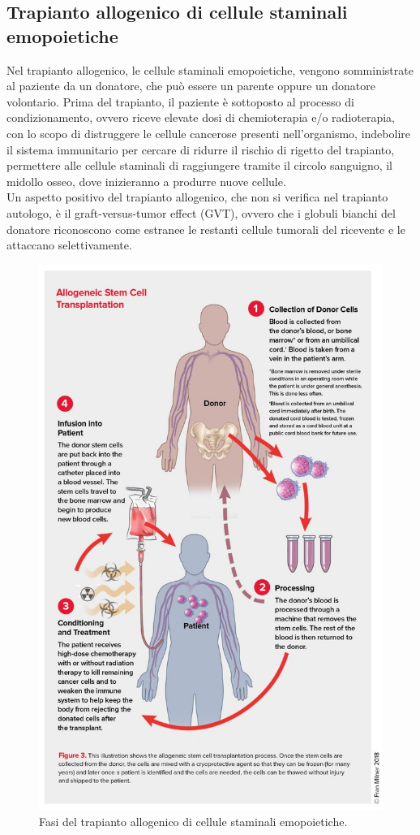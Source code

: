 \subsection{Trapianto allogenico di cellule staminali emopoietiche}

Nel trapianto allogenico, le cellule staminali emopoietiche, vengono somministrate al paziente da un donatore, 
che può essere un parente oppure un donatore volontario. 
Prima del trapianto, il paziente è sottoposto al processo di condizionamento, ovvero riceve elevate dosi di 
chemioterapia e/o radioterapia, con lo scopo di distruggere le cellule cancerose presenti nell’organismo, 
indebolire il sistema immunitario per cercare di ridurre il rischio di rigetto del trapianto, permettere alle 
cellule staminali di raggiungere tramite il circolo sanguigno, il midollo osseo, dove inizieranno a produrre nuove 
cellule.\\
Un aspetto positivo del trapianto allogenico, che non si verifica nel trapianto autologo, è il graft-versus-tumor 
effect (GVT), ovvero che i globuli bianchi del donatore riconoscono come estranee le restanti cellule tumorali 
del ricevente e le attaccano selettivamente\cite{LLSBLOOD}.\\

\begin{figure}[H]
    \begin{center}
    \includegraphics[width=0.8\columnwidth]{img/ALLOGENICO.jpg}
    \end{center}
    \caption[Fasi del trapianto allogenico di cellule staminali emopoietiche.]{Fasi del trapianto allogenico di cellule staminali emopoietiche.
    \cite{img37}}

\end{figure}

